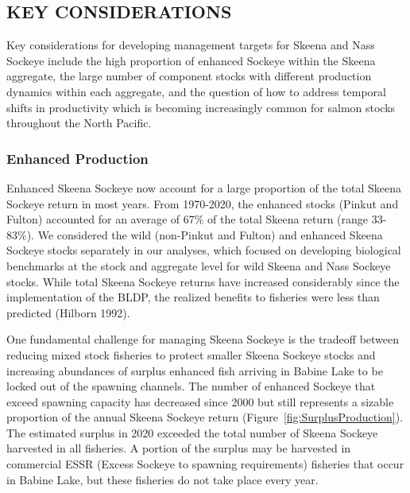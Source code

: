 \documentclass[french,11pt]{book}
\begin{document}
\subsection{KEY CONSIDERATIONS}\label{KeyConsiderations}

Key considerations for developing management targets for Skeena and Nass Sockeye include the high proportion of enhanced Sockeye within the Skeena aggregate, the large number of component stocks with different production dynamics within each aggregate, and the question of how to address temporal shifts in productivity which is becoming increasingly common for salmon stocks throughout the North Pacific.

\subsubsection{Enhanced Production}\label{enhanced-production}

Enhanced Skeena Sockeye now account for a large proportion of the total Skeena Sockeye return in most years. From 1970-2020, the enhanced stocks (Pinkut and Fulton) accounted for an average of 67\% of the total Skeena return (range 33-83\%). We considered the wild (non-Pinkut and Fulton) and enhanced Skeena Sockeye stocks separately in our analyses, which focused on developing biological benchmarks at the stock and aggregate level for wild Skeena and Nass Sockeye stocks. While total Skeena Sockeye returns have increased considerably since the implementation of the BLDP, the realized benefits to fisheries were less than predicted (Hilborn 1992).

One fundamental challenge for managing Skeena Sockeye is the tradeoff between reducing mixed stock fisheries to protect smaller Skeena Sockeye stocks and increasing abundances of surplus enhanced fish arriving in Babine Lake to be locked out of the spawning channels. The number of enhanced Sockeye that exceed spawning capacity has decreased since 2000 but still represents a sizable proportion of the annual Skeena Sockeye return (Figure~\ref{fig:SurplusProduction}). The estimated surplus in 2020 exceeded the total number of Skeena Sockeye harvested in all fisheries. A portion of the surplus may be harvested in commercial ESSR (Excess Sockeye to spawning requirements) fisheries that occur in Babine Lake, but these fisheries do not take place every year.
\end{document}
